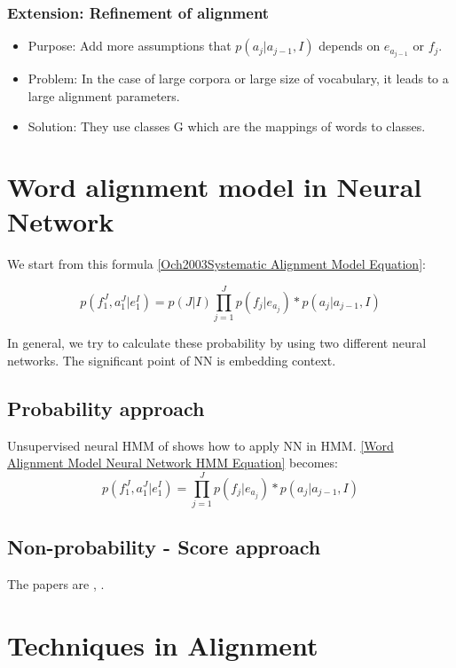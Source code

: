 \documentclass{article}
\begin{document}
\subsubsection{Extension: Refinement of alignment}

\begin{itemize}
\item Purpose: Add more assumptions that $p(a_j | a_{j-1}, I)$ depends on $e_{a_{j -1}}$ or $f_j$.
\item Problem: In the case of large corpora or large size of vocabulary, it leads to a large alignment parameters.
\item Solution: They use classes G which are the mappings of words to classes.
\end{itemize}

\section{Word alignment model in Neural Network}
We start from this formula \eqref{Och2003Systematic Alignment Model Equation}:

\begin{equation}
p(f_1^J, a_1^J|e_1^I) = p(J|I) \prod_{j=1}^J p(f_j | e_{a_j}) * p(a_j | a_{j-1}, I)
\label{Word Alignment Model Neural Network HMM Equation}
\end{equation}

In general, we try to calculate these probability by using two different neural networks.
The significant point of NN is embedding context.

\subsection{Probability approach}
Unsupervised neural HMM of \cite{Tran16unsupervised} shows how to apply NN in HMM. \eqref{Word Alignment Model Neural Network HMM Equation} becomes:
\begin{equation}
p(f_1^J, a_1^J|e_1^I) = \prod_{j=1}^J p(f_j | e_{a_j}) * p(a_j | a_{j-1}, I)
\end{equation}






\subsection{Non-probability - Score approach}
The papers are \cite{Yang13word}, \cite{Tamura14recurrent}.

\section{Techniques in Alignment}
\end{document}

